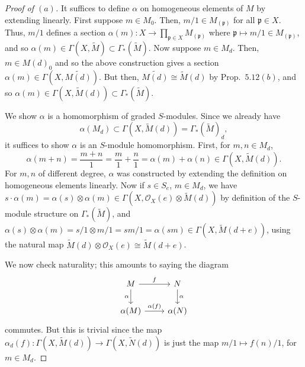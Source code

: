 \documentclass[12pt,letterpaper]{article}
\theoremstyle{definition}
\theoremstyle{remark}
\numberwithin{equation}{section}
\numberwithin{figure}{problem}
\newcommand{\OO}{\mathcal{O}}
\begin{document}
\begin{proof}[Proof of $(a)$]
  It suffices to define $\alpha$ on homogeneous elements of $M$ by extending linearly. First suppose $m \in M_0$. Then, $m/1 \in M_{(\mathfrak{p})}$ for all $\mathfrak{p} \in X$. Thus, $m/1$ defines a section $\alpha(m)\colon X \to \prod_{\mathfrak{p}\in X} M_{(\mathfrak{p})}$ where $\mathfrak{p} \mapsto m/1 \in M_{(\mathfrak{p})}$, and so $\alpha(m) \in \Gamma(X,\tilde{M}) \subset \Gamma_*(\tilde{M})$. Now suppose $m \in M_d$. Then, $m \in M(d)_0$ and so the above construction gives a section $\alpha(m) \in \Gamma(X,\widetilde{M(d)})$. But then, $\widetilde{M(d)} \cong \tilde{M}(d)$ by Prop.~$5.12(b)$, and so $\alpha(m) \in \Gamma(X,\tilde{M}(d)) \subset \Gamma_*(\tilde{M})$.
  \par We show $\alpha$ is a homomorphism of graded $S$-modules. Since we already have
  \begin{equation*}
    \alpha(M_d) \subset \Gamma(X,\tilde{M}(d)) = \Gamma_*(\tilde{M})_d,
  \end{equation*}
  it suffices to show $\alpha$ is an $S$-module homomorphism. First, for $m,n \in M_d$,
  \begin{equation*}
    \alpha(m+n) = \frac{m+n}{1} = \frac{m}{1} + \frac{n}{1} = \alpha(m) + \alpha(n) \in \Gamma(X,\tilde{M}(d)).
  \end{equation*}
  For $m,n$ of different degree, $\alpha$ was constructed by extending the definition on ho\-mo\-ge\-neous elements linearly. Now if $s \in S_e$, $m \in M_d$, we have $s \cdot \alpha(m) = \alpha(s) \otimes \alpha(m) \in \Gamma(X,\OO_X(e) \otimes \tilde{M}(d))$ by definition of the $S$-module structure on $\Gamma_*(\tilde{M})$, and $\alpha(s) \otimes \alpha(m) = s/1 \otimes m/1 = sm/1 = \alpha(sm) \in \Gamma(X,\tilde{M}(d+e))$, using the natural map $\tilde{M}(d) \otimes \OO_X(e) \cong \tilde{M}(d+e)$.
  \par We now check naturality; this amounts to saying the diagram
  \begin{equation}\label{alphnattrans}
    \begin{tikzcd}
      M \rar{f}\dar[swap]{\alpha} & N\dar{\alpha}\\
      \alpha(M) \rar{\alpha(f)} & \alpha(N)
    \end{tikzcd}
  \end{equation}
  commutes. But this is trivial since the map $\alpha_d(f)\colon \Gamma(X,\tilde{M}(d)) \to \Gamma(X,\tilde{N}(d))$ is just the map $m/1 \mapsto f(n)/1$, for $m \in M_d$.
\end{proof}
\end{document}
